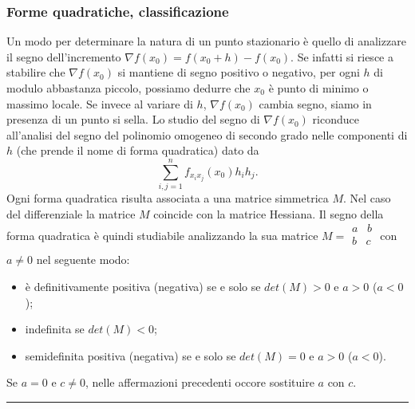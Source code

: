 \subsubsection*{Forme quadratiche, classificazione}
Un modo per determinare la natura di un punto stazionario è quello di analizzare il segno dell'incremento $\nabla f(x_0) = f(x_0 + h ) - f(x_0)$. Se infatti si riesce a stabilire che $\nabla f(x_0)$ si mantiene di segno positivo o negativo, per ogni $h$ di modulo abbastanza piccolo, possiamo dedurre che $x_0$ è punto di minimo o massimo locale. Se invece al variare di $h$, $\nabla f(x_0)$ cambia segno, siamo in presenza di un punto si sella.\newline
Lo studio del segno di $\nabla f(x_0)$ riconduce all'analisi del segno del polinomio omogeneo di secondo grado nelle componenti di $h$ (che prende il nome di forma quadratica) dato da
\[
    \sum_{i,j=1}^{n}f_{x_ix_j}(x_0)h_ih_j.
\]
Ogni forma quadratica risulta associata a una matrice simmetrica $M$. Nel caso del differenziale la matrice $M$ coincide con la matrice Hessiana.\newline
Il segno della forma quadratica è quindi studiabile analizzando la sua matrice $M = \begin{matrix}
    a \;\;\; b\\
    b \;\;\; c\\
\end{matrix}$ con $a\neq 0$ nel seguente modo:
\begin{itemize}
    \item è definitivamente positiva (negativa) se e solo se $det(M)>0$ e $a >0$ ($a<0$);
    \item indefinita se $det(M)<0$;
    \item semidefinita positiva (negativa) se e solo se $det(M)=0$ e $a>0$ ($a<0$).
\end{itemize}
Se $a = 0$ e $c\neq 0$, nelle affermazioni precedenti occore sostituire $a$ con $c$. \newline
\rule{\textwidth}{0.4pt}

